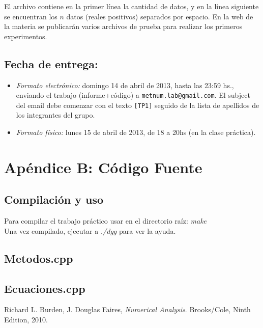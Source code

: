 \documentclass[a4paper,10pt,twoside]{article}
\begin{document}
\vspace{0.5cm}

El archivo contiene en la primer l\'inea la cantidad de datos, y en la l\'inea siguiente se encuentran los $n$ datos (reales positivos) separados por espacio. En la web de la materia se publicar\'an varios archivos de prueba para realizar los primeros experimentos.

\subsection{Fecha de entrega:} 

\begin{itemize}
\item \textsl{Formato electr\'onico:} domingo 14 de abril de 2013, hasta las 23:59 hs., enviando el trabajo (informe+c\'odigo) a \texttt{metnum.lab@gmail.com}. El subject del email debe comenzar con el texto \verb|[TP1]| seguido de la lista de apellidos de los integrantes del grupo. 
\item \textsl{Formato f\'isico:} lunes 15 de abril de 2013, de 18 a 20hs (en la clase pr\'actica).
\end{itemize}




\section{Apéndice B: Código Fuente}
\subsection{Compilación y uso}
Para compilar el trabajo práctico usar en el directorio raíz: \emph{make} \\
Una vez compilado, ejecutar a \emph{./dgg} para ver la ayuda.
\subsection{Metodos.cpp}

\subsection{Ecuaciones.cpp}





\begin{thebibliography}{1}
        Richard L. Burden,
        J. Douglas Faires,
        \emph{Numerical Analysis}.
        Brooks/Cole,
        Ninth Edition,
        2010.
\end{thebibliography}
\end{document}
